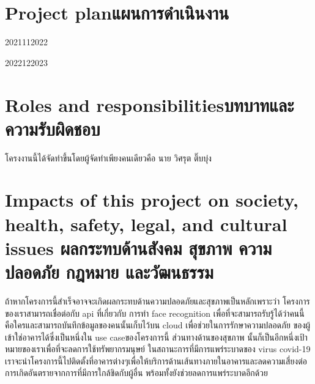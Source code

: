 \section{\ifenglish Project plan\else แผนการดำเนินงาน\fi}

\begin{plan}{11}{2021}{11}{2022}
\end{plan}

\begin{plan}{12}{2022}{12}{2023}
\end{plan}

\section{\ifenglish Roles and responsibilities\else บทบาทและความรับผิดชอบ\fi}
โครงงานนี้ได้จัดทำขึ้นโดยผู้จัดทำเพียงคนเดียวคือ นาย วิศรุต ติ๊บบุ่ง

\section{\ifenglish%
Impacts of this project on society, health, safety, legal, and cultural issues
\else%
ผลกระทบด้านสังคม สุขภาพ ความปลอดภัย กฎหมาย และวัฒนธรรม
\fi}
ถ้าหากโครงการนี้สำเร็จอาจจะเกิดผลกระทบด้านความปลอดภัยและสุขภาพเป็นหลักเพราะว่า โครงการของเราสามารถเชื่อต่อกับ api ที่เกี่ยวกับ
การทำ face recognition เพื่อที่จะสามารถรับรู้ได้ว่าคนนี้คือใครและสามารถบันทึกข้อมูลของคนนั้นเก็บไว้บน cloud เพื่อช่วยในการรักษาความปลอดภัย
ของผู้เข้าใช่อาคารได้ซึ่งเป็นหนึ่งใน use caseของโครงการนี้ ส่วนทางด้านของสุขภาพ นั้นก็เป็นอีกหนึ่งเป้าหมายของเราเพื่อที่จะลดการใช้ทรัพยากรมนุษย์ 
ในสถานะการที่มีการแพร่ระบาดของ virus covid-19 เราจะนำโครงการนี้ไปติดตั้งที่อาคารต่างๆเพื่อให้บริการด้านเส้นทางภายในอาคารและลดความเสี่ยงต่อ
การเกิดอันตรายจากการที่มีการใกล้ชิดกับผู้อื่น พร้อมทั้งยังช่วยลดการแพร่ระบาดอีกด้วย